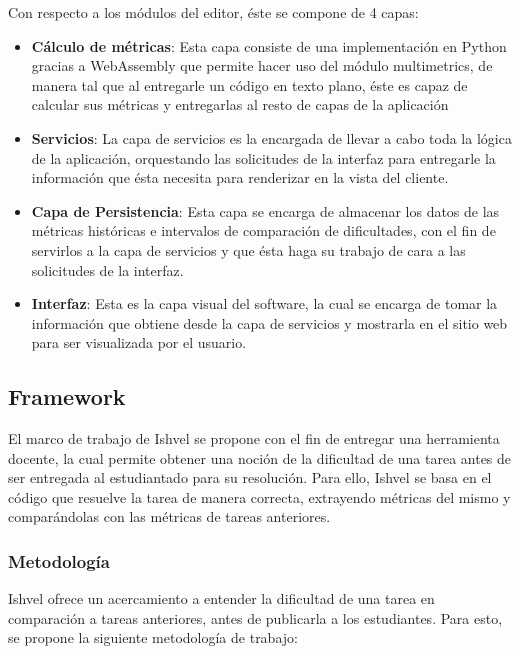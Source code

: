 \documentclass[letterpaper,12pt]{article}
\begin{document}
Con respecto a los módulos del editor, éste se compone de 4 capas:

\begin{itemize}
  \item \textbf{Cálculo de métricas}: Esta capa consiste de una implementación en Python gracias a WebAssembly que permite hacer uso del módulo multimetrics\cite{privkweihmann_multimetricprog}, de manera tal que al entregarle un código en texto plano, éste es capaz de calcular sus métricas y entregarlas al resto de capas de la aplicación
  \item \textbf{Servicios}: La capa de servicios es la encargada de llevar a cabo toda la lógica de la aplicación, orquestando las solicitudes de la interfaz para entregarle la información que ésta necesita para renderizar en la vista del cliente.
  \item \textbf{Capa de Persistencia}: Esta capa se encarga de almacenar los datos de las métricas históricas e intervalos de comparación de dificultades, con el fin de servirlos a la capa de servicios y que ésta haga su trabajo de cara a las solicitudes de la interfaz.
  \item \textbf{Interfaz}: Esta es la capa visual del software, la cual se encarga de tomar la información que obtiene desde la capa de servicios y mostrarla en el sitio web para ser visualizada por el usuario.
\end{itemize}

\subsection{Framework}

El marco de trabajo de Ishvel se propone con el fin de entregar una herramienta docente, la cual permite obtener una noción de la dificultad de una tarea antes de ser entregada al estudiantado para su resolución. Para ello, Ishvel se basa en el código que resuelve la tarea de manera correcta, extrayendo métricas del mismo y comparándolas con las métricas de tareas anteriores.

\subsubsection{Metodología}

Ishvel ofrece un acercamiento a entender la dificultad de una tarea en comparación a tareas anteriores, antes de publicarla a los estudiantes. Para esto, se propone la siguiente metodología de trabajo:
\end{document}
